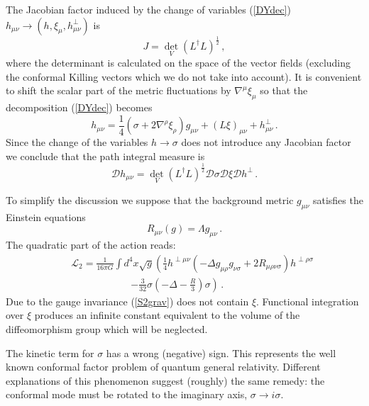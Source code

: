 The Jacobian factor induced by the change of variables
(\ref{DYdec}) $h_{\mu\nu}\to (h,\xi_\mu ,h_{\mu\nu}^\perp )$
is
\begin{equation}
J=\det_V (L^\dag L)^{\frac 12} \,,\label{Jgrav}
\end{equation}
where the determinant is calculated on the space of the vector
fields (excluding the conformal Killing vectors which we do not
take into account). It is convenient to shift the scalar
part of the metric fluctuations by $\nabla^\mu \xi_\mu$ so that
the decomposition (\ref{DYdec}) becomes
\begin{equation}
h_{\mu\nu} =\frac 14 (\sigma +2\nabla^\rho \xi_\rho )
g_{\mu\nu} +(L\xi )_{\mu\nu} +
h^\perp_{\mu\nu} \,. \label{DYnew}
\end{equation}
Since the change of the variables $h\to \sigma$ does not introduce
any Jacobian factor we conclude that the path integral measure is
\begin{equation}
\mathcal{D}h_{\mu\nu} =\det_V (L^\dag L)^{\frac 12}
\mathcal{D}\sigma \mathcal{D}\xi \mathcal{D}h^\perp \,.
\label{measgr}
\end{equation}

To simplify the discussion we suppose that the background metric
$g_{\mu\nu}$ satisfies the Einstein equations
\begin{equation}
R_{\mu\nu}(g)=\Lambda g_{\mu\nu} \,. \label{Einsteq}
\end{equation}
The quadratic part of the action reads:
\begin{eqnarray}
&&\mathcal{L}_2=\frac 1{16\pi G} \int d^4x \sqrt {g} \left(\frac 14
h^{\perp \mu \nu}(-\Delta g_{\mu \rho } g_{\nu \sigma}
+2R_{\mu \rho \nu \sigma})h^{\perp \rho \sigma}\right. \nonumber \\
&&\qquad\qquad\qquad \left.
-\frac 3{32} \sigma \left(-\Delta -\frac R3 \right) \sigma \right) \,.
\label{S2grav}
\end{eqnarray}
Due to the gauge invariance (\ref{S2grav}) does not contain $\xi$.
Functional integration over $\xi$ produces an infinite constant
equivalent to the volume of the diffeomorphism group which
will be neglected.

The kinetic term for $\sigma$ has a wrong (negative) sign. This
represents the well known conformal factor problem of quantum
general relativity. Different explanations of this phenomenon
\cite{Gibbons:1978ac,Schleich:1987fm,Mazur:1990by,Novozhilov:1991tf}
suggest (roughly) the same remedy: the conformal mode must be rotated
to the imaginary axis, $\sigma\to i\sigma$.

